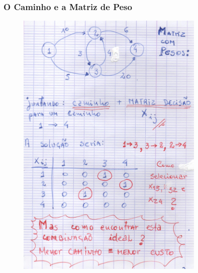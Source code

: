 \documentclass{beamer}
\begin{document}
\begin{frame}
	\frametitle{O Caminho e a Matriz de Peso}
	
	\begin{figure}[tbp]
		\includegraphics[width=0.8\textwidth , height=0.8\textheight]{06_um_caminho_e_matriz.pdf}
		\centering
	\end{figure}
\end{frame}
\end{document}

